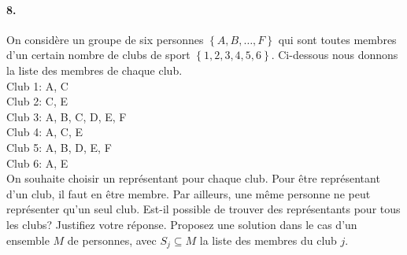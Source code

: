 \paragraph{8. } On considère un groupe de six personnes $\left\lbrace A, B, … , F \right\rbrace$ qui sont toutes membres d'un certain nombre de clubs de sport $\left\lbrace 1, 2, 3, 4, 5, 6 \right\rbrace$. Ci-dessous nous donnons la liste des membres de chaque club. \\
Club 1: A, C \\
Club 2: C, E \\
Club 3: A, B, C, D, E, F \\
Club 4: A, C, E \\
Club 5: A, B, D, E, F \\
Club 6: A, E\\
On souhaite choisir un représentant pour chaque club. Pour être représentant d'un club, il faut en être membre. Par ailleurs, une même personne ne peut représenter qu'un seul club. Est-il possible de trouver des représentants pour tous les clubs? Justifiez votre réponse. Proposez une solution dans le cas d'un ensemble $M$ de personnes, avec $S_j \subseteq M$ la liste des membres du club $j$. 
